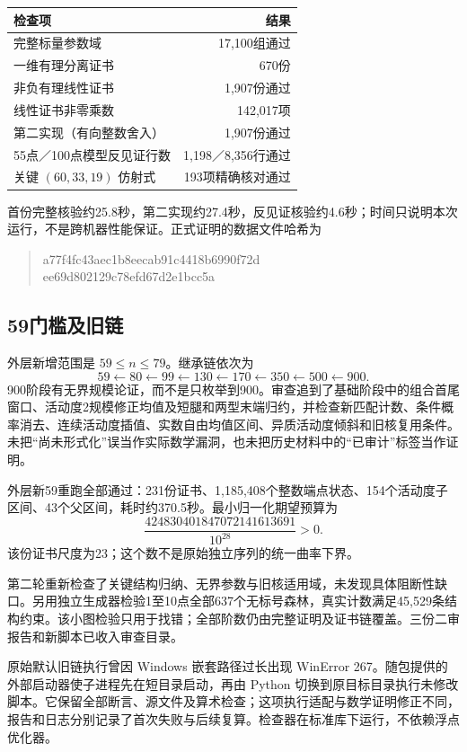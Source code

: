 \documentclass[UTF8,10pt,a4paper]{ctexart}
\begin{document}
\begin{center}\begin{tabular}{lr}\toprule
检查项 & 结果\\\midrule
完整标量参数域 & 17,100组通过\\
一维有理分离证书 & 670份\\
非负有理线性证书 & 1,907份通过\\
线性证书非零乘数 & 142,017项\\
第二实现（有向整数舍入） & 1,907份通过\\
55点／100点模型反见证行数 & 1,198／8,356行通过\\
关键 $(60,33,19)$ 仿射式 & 193项精确核对通过\\\bottomrule
\end{tabular}\end{center}
首份完整核验约25.8秒，第二实现约27.4秒，反见证核验约4.6秒；时间只说明本次运行，不是跨机器性能保证。正式证明的数据文件哈希为
\begin{quote}\small\ttfamily
a77f4fc43aec1b8eecab91c4418b6990f72d\\
ee69d802129c78efd67d2e1bcc5a
\end{quote}

\subsection{59门槛及旧链}
外层新增范围是 $59\le n\le79$。继承链依次为
\[
59\longleftarrow80\longleftarrow99\longleftarrow130
\longleftarrow170\longleftarrow350\longleftarrow500\longleftarrow900.
\]
900阶段有无界规模论证，而不是只枚举到900。审查追到了基础阶段中的组合首尾窗口、活动度2规模修正均值及短腿和两型末端归约，并检查新匹配计数、条件概率消去、连续活动度插值、实数自由均值区间、异质活动度倾斜和旧核复用条件。未把“尚未形式化”误当作实际数学漏洞，也未把历史材料中的“已审计”标签当作证明。

外层新59重跑全部通过：231份证书、1,185,408个整数端点状态、154个活动度子区间、43个父区间，耗时约370.5秒。最小归一化期望预算为
\[
\frac{424830401847072141613691}{10^{28}}>0.
\]
该份证书尺度为23；这个数不是原始独立序列的统一曲率下界。



第二轮重新检查了关键结构归纳、无界参数与旧核适用域，未发现具体阻断性缺口。另用独立生成器检验1至10点全部637个无标号森林，真实计数满足45,529条结构约束。该小图检验只用于找错；全部阶数仍由完整证明及证书链覆盖。三份二审报告和新脚本已收入审查目录。

原始默认旧链执行曾因 Windows 嵌套路径过长出现 WinError 267。随包提供的外部启动器使子进程先在短目录启动，再由 Python 切换到原目标目录执行未修改脚本。它保留全部断言、源文件及算术检查；这项执行适配与数学证明修正不同，报告和日志分别记录了首次失败与后续复算。检查器在标准库下运行，不依赖浮点优化器。
\end{document}
